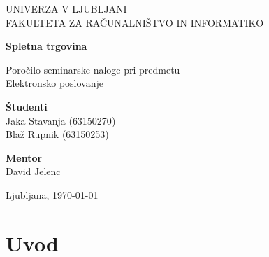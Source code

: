\documentclass[a4paper,12pt]{report}
\newcommand{\naslov}     {Spletna trgovina}
\newcommand{\prviavtor}  {Jaka Stavanja}
\newcommand{\prviindeks} {63150270}
\newcommand{\drugiavtor} {Blaž Rupnik}
\newcommand{\drugiindeks}{63150253}
\newcommand{\kraj}       {Ljubljana}
\begin{document}
\begin{titlepage}
	\begin{center}
	{UNIVERZA V LJUBLJANI\\[10pt] 
	FAKULTETA ZA RAČUNALNIŠTVO IN INFORMATIKO}

	\vspace{65mm}

	{\Large\textbf{\naslov}}

	\vspace{10mm}

	{\large Poročilo seminarske naloge pri predmetu\\[10pt] Elektronsko poslovanje}

	\vfill
	\vspace{60mm}

\hspace{20mm}
\begin{minipage}[t]{70mm}
	{\bf Študenti}\\
	{\prviavtor} ({\prviindeks})\\ 
	{\drugiavtor} ({\drugiindeks})
\end{minipage}
\begin{minipage}[t]{50mm}
	{\bf Mentor}\\
	David Jelenc
\end{minipage}

	\vspace{35mm}

	{	\kraj, \today}
	\end{center}
\end{titlepage}


\tableofcontents


\chapter{Uvod}
\end{document}
